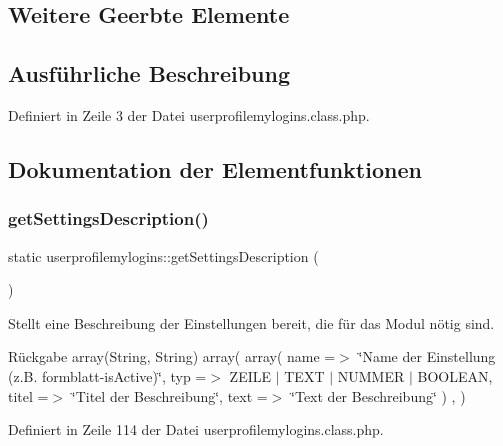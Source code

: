 \subsection*{Weitere Geerbte Elemente}


\subsection{Ausführliche Beschreibung}


Definiert in Zeile 3 der Datei userprofilemylogins.\+class.\+php.



\subsection{Dokumentation der Elementfunktionen}
\mbox{\label{classuserprofilemylogins_acf5efa57bb9e85e2254bdf9abf7f0317}} 
\subsubsection{\texorpdfstring{get\+Settings\+Description()}{getSettingsDescription()}}
{\footnotesize\ttfamily static userprofilemylogins\+::get\+Settings\+Description (\begin{DoxyParamCaption}{ }\end{DoxyParamCaption})\hspace{0.3cm}{\ttfamily [static]}}

Stellt eine Beschreibung der Einstellungen bereit, die für das Modul nötig sind. \begin{DoxyReturn}{Rückgabe}
array(\+String, String) array( array( \textquotesingle{}name\textquotesingle{} =$>$ \char`\"{}\+Name der Einstellung (z.\+B. formblatt-\/is\+Active)\char`\"{}, \textquotesingle{}typ\textquotesingle{} =$>$ Z\+E\+I\+LE $\vert$ T\+E\+XT $\vert$ N\+U\+M\+M\+ER $\vert$ B\+O\+O\+L\+E\+AN, \textquotesingle{}titel\textquotesingle{} =$>$ \char`\"{}\+Titel der Beschreibung\char`\"{}, \textquotesingle{}text\textquotesingle{} =$>$ \char`\"{}\+Text der Beschreibung\char`\"{} ) , ) 
\end{DoxyReturn}


Definiert in Zeile 114 der Datei userprofilemylogins.\+class.\+php.

